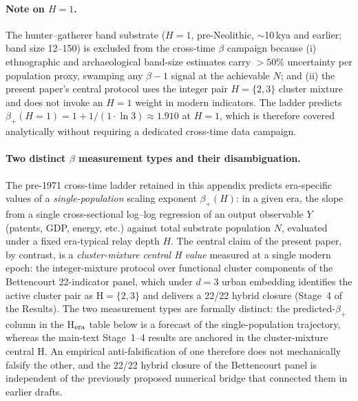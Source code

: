 \paragraph{Note on $H{=}1$.} The hunter--gatherer band substrate ($H{=}1$, pre-Neolithic, $\sim$10\,kya and earlier; band size 12--150) is excluded from the cross-time $\beta$ campaign because (i) ethnographic and archaeological band-size estimates carry $>50\%$ uncertainty per population proxy, swamping any $\beta\!-\!1$ signal at the achievable $N$; and (ii) the present paper's central protocol uses the integer pair $H{=}\{2,3\}$ cluster mixture and does not invoke an $H{=}1$ weight in modern indicators. The ladder predicts $\beta_+(H{=}1)=1+1/(1\cdot\ln 3)\approx 1.910$ at $H{=}1$, which is therefore covered analytically without requiring a dedicated cross-time data campaign.

\paragraph{Two distinct $\beta$ measurement types and their disambiguation.}
The pre-1971 cross-time ladder retained in this appendix predicts era-specific values of a \emph{single-population} scaling exponent $\beta_+(H)$: in a given era, the slope from a single cross-sectional log--log regression of an output observable $Y$ (patents, GDP, energy, etc.) against total substrate population $N$, evaluated under a fixed era-typical relay depth $H$. The central claim of the present paper, by contrast, is a \emph{cluster-mixture central H value} measured at a single modern epoch: the integer-mixture protocol over functional cluster components of the Bettencourt 22-indicator panel, which under $d{=}3$ urban embedding identifies the active cluster pair as H$=\{2,3\}$ and delivers a 22/22 hybrid closure (Stage~4 of the Results). The two measurement types are formally distinct: the predicted-$\beta_+$ column in the H$_{\rm era}$ table below is a forecast of the single-population trajectory, whereas the main-text Stage~1--4 results are anchored in the cluster-mixture central H. An empirical anti-falsification of one therefore does not mechanically falsify the other, and the 22/22 hybrid closure of the Bettencourt panel is independent of the previously proposed numerical bridge that connected them in earlier drafts.

